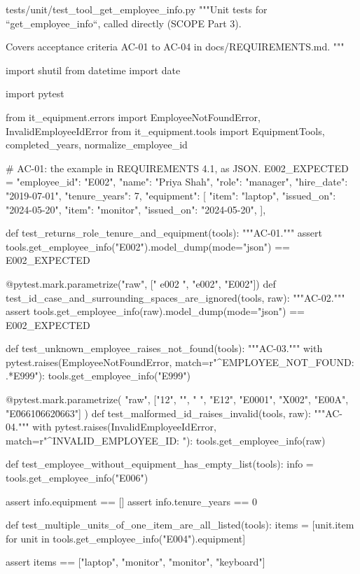 \documentclass[11pt,letterpaper]{article}
\renewcommand{\_}{\textunderscore\allowbreak}
\begin{document}
\begin{codebox}{tests/unit/test_tool_get_employee_info.py}
"""Unit tests for ``get_employee_info``, called directly (SCOPE Part 3).

Covers acceptance criteria AC-01 to AC-04 in docs/REQUIREMENTS.md.
"""

import shutil
from datetime import date

import pytest

from it_equipment.errors import EmployeeNotFoundError, InvalidEmployeeIdError
from it_equipment.tools import EquipmentTools, completed_years, normalize_employee_id

# AC-01: the example in REQUIREMENTS 4.1, as JSON.
E002_EXPECTED = {
    "employee_id": "E002",
    "name": "Priya Shah",
    "role": "manager",
    "hire_date": "2019-07-01",
    "tenure_years": 7,
    "equipment": [
        {"item": "laptop", "issued_on": "2024-05-20"},
        {"item": "monitor", "issued_on": "2024-05-20"},
    ],
}


def test_returns_role_tenure_and_equipment(tools):
    """AC-01."""
    assert tools.get_employee_info("E002").model_dump(mode="json") == E002_EXPECTED


@pytest.mark.parametrize("raw", [" e002 ", "e002", "E002\n"])
def test_id_case_and_surrounding_spaces_are_ignored(tools, raw):
    """AC-02."""
    assert tools.get_employee_info(raw).model_dump(mode="json") == E002_EXPECTED


def test_unknown_employee_raises_not_found(tools):
    """AC-03."""
    with pytest.raises(EmployeeNotFoundError, match=r"^EMPLOYEE_NOT_FOUND: .*E999"):
        tools.get_employee_info("E999")


@pytest.mark.parametrize(
    "raw", ["12", "", "   ", "E12", "E0001", "X002", "E00A", "E\u0661\u0662\u0663"]
)
def test_malformed_id_raises_invalid(tools, raw):
    """AC-04."""
    with pytest.raises(InvalidEmployeeIdError, match=r"^INVALID_EMPLOYEE_ID: "):
        tools.get_employee_info(raw)


def test_employee_without_equipment_has_empty_list(tools):
    info = tools.get_employee_info("E006")

    assert info.equipment == []
    assert info.tenure_years == 0


def test_multiple_units_of_one_item_are_all_listed(tools):
    items = [unit.item for unit in tools.get_employee_info("E004").equipment]

    assert items == ["laptop", "monitor", "monitor", "keyboard"]



\end{codebox}
\end{document}
